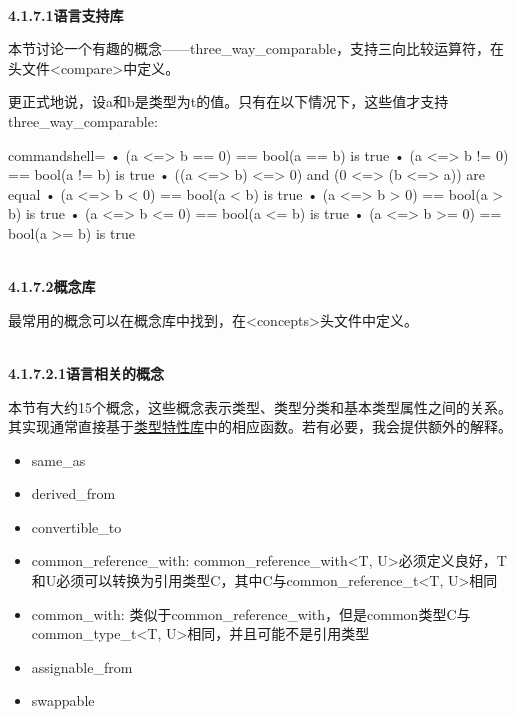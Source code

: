 \hspace*{\fill} \\ %
\noindent
\textbf{4.1.7.1\hspace{0.2cm}语言支持库}

本节讨论一个有趣的概念——three\_way\_comparable，支持三向比较运算符，在头文件<compare>中定义。

更正式地说，设a和b是类型为t的值。只有在以下情况下，这些值才支持three\_way\_comparable:

\begin{tcblisting}{commandshell={}}
• (a <=> b == 0) == bool(a == b) is true
• (a <=> b != 0) == bool(a != b) is true
• ((a <=> b) <=> 0) and (0 <=> (b <=> a)) are equal
• (a <=> b < 0) == bool(a < b) is true
• (a <=> b > 0) == bool(a > b) is true
• (a <=> b <= 0) == bool(a <= b) is true
• (a <=> b >= 0) == bool(a >= b) is true
\end{tcblisting}

\hspace*{\fill} \\ %
\noindent
\textbf{4.1.7.2\hspace{0.2cm}概念库}

最常用的概念可以在概念库中找到，在<concepts>头文件中定义。

\hspace*{\fill} \\ %
\noindent
\textbf{4.1.7.2.1\hspace{0.2cm}语言相关的概念}

本节有大约15个概念，这些概念表示类型、类型分类和基本类型属性之间的关系。其实现通常直接基于\href{https://en.cppreference.com/w/cpp/header/type_traits}{类型特性库}中的相应函数。若有必要，我会提供额外的解释。

\begin{itemize}
\item
same\_as

\item
derived\_from

\item
convertible\_to

\item
common\_reference\_with: common\_reference\_with<T, U>必须定义良好，T和U必须可以转换为引用类型C，其中C与common\_reference\_t<T, U>相同

\item
common\_with: 类似于common\_reference\_with，但是common类型C与common\_type\_t<T, U>相同，并且可能不是引用类型

\item
assignable\_from

\item
swappable
\end{itemize}

